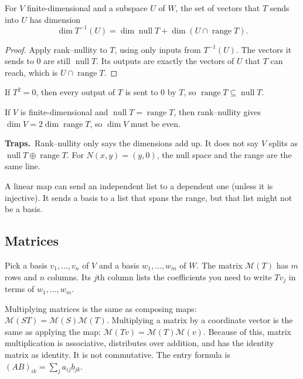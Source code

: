 \documentclass[11pt]{scrartcl}
\DeclareMathOperator{\nul}{null}
\DeclareMathOperator{\range}{range}
\newcommand{\MM}{\mathcal M}
\newcommand{\traps}{\par\medskip\noindent\textbf{\color{RawSienna}Traps.}\ }
\begin{document}
\begin{proposition*}
  For $V$ finite-dimensional and a subspace $U$ of $W$, the set of vectors that $T$ sends into $U$ has dimension
  \[ \dim T^{-1}(U)=\dim\nul T+\dim(U\cap\range T). \]
\end{proposition*}
\begin{proof}
  Apply rank--nullity to $T$, using only inputs from $T^{-1}(U)$.
  The vectors it sends to $0$ are still $\nul T$.
  Its outputs are exactly the vectors of $U$ that $T$ can reach, which is $U\cap\range T$.
\end{proof}

\begin{proposition*}[HW3 P2]
  If $T^2=0$, then every output of $T$ is sent to $0$ by $T$, so $\range T\subseteq\nul T$.

  If $V$ is finite-dimensional and $\nul T=\range T$, then rank--nullity gives $\dim V=2\dim\range T$, so $\dim V$ must be even.
\end{proposition*}

\traps Rank--nullity only says the dimensions add up. It does not say $V$ splits as $\nul T\oplus\range T$. For $N(x,y)=(y,0)$, the null space and the range are the same line.

A linear map can send an independent list to a dependent one (unless it is injective).
It sends a basis to a list that spans the range, but that list might not be a basis.

\subsection{Matrices}
\begin{definition*}
  Pick a basis $v_1,\dots,v_n$ of $V$ and a basis $w_1,\dots,w_m$ of $W$.
  The matrix $\MM(T)$ has $m$ rows and $n$ columns.
  Its $j$th column lists the coefficients you need to write $Tv_j$ in terms of $w_1,\dots,w_m$.
\end{definition*}

\begin{proposition*}
  Multiplying matrices is the same as composing maps: $\MM(ST)=\MM(S)\MM(T)$.
  Multiplying a matrix by a coordinate vector is the same as applying the map: $\MM(Tv)=\MM(T)\MM(v)$.
  Because of this, matrix multiplication is associative, distributes over addition, and has the identity matrix as identity. It is not commutative.
  The entry formula is $(AB)_{ik}=\sum_j a_{ij}b_{jk}$.
\end{proposition*}
\end{document}
